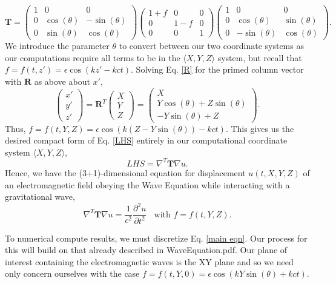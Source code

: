\documentclass{article}
\begin{document}
\begin{equation*}
\textbf{T}=
\begin{pmatrix}
1 & 0 & 0 \\
0 & \cos(\theta) & -\sin(\theta) \\
0 & \sin(\theta) & \cos(\theta)
\end{pmatrix}
\begin{pmatrix}
1+f & 0 & 0 \\
0 & 1-f & 0 \\
0 & 0 & 1
\end{pmatrix}
\begin{pmatrix}
1 & 0 & 0 \\
0 & \cos(\theta) & \sin(\theta) \\
0 & -\sin(\theta) & \cos(\theta)
\end{pmatrix}.
\end{equation*}
We introduce the parameter $\theta$ to convert between our two coordinate systems as our computations require all terms to be in the $\langle X,Y,Z\rangle$ system, but recall that $f=f(t,z\prime)=\epsilon \cos(kz\prime-kct)$. Solving Eq. \ref{R} for the primed column vector with $\textbf{R}$ as above about $x\prime$,
\begin{equation*}
\begin{pmatrix}
x\prime \\
y\prime \\
z\prime
\end{pmatrix}
= \textbf{R}^{T}\begin{pmatrix}
X \\
Y \\
Z
\end{pmatrix}
=\begin{pmatrix}
X \\
Y\cos(\theta)+Z\sin(\theta) \\
-Y\sin(\theta)+Z\
\end{pmatrix}.
\end{equation*}
Thus, $f=f(t,Y,Z)=\epsilon \cos(k(Z-Y\sin(\theta))-kct)$. This gives us the desired compact form of Eq. \ref{LHS} entirely in our computational coordinate system $\langle X,Y,Z\rangle$,
\begin{equation*}
LHS = \nabla^T \textbf{T} \nabla u.
\end{equation*}
Hence, we have the (3+1)-dimensional equation for displacement $u(t,X,Y,Z)$ of an electromagnetic field obeying the Wave Equation while interacting with a gravitational wave,
\begin{equation}\label{main eqn}
\boxed{
\nabla^T \textbf{T} \nabla u = \frac{1}{c^2}\frac{\partial^2 u}{\partial t^2} \ \ \ \ \mbox{with } f=f(t,Y,Z).
}
\end{equation}

To numerical compute results, we must discretize Eq. \ref{main eqn}. Our process for this will build on that already described in WaveEquation.pdf. Our plane of interest containing the electromagnetic waves is the XY plane and so we need only concern ourselves with the case $f=f(t,Y,0)=\epsilon \cos(kY\sin(\theta)+kct).$
\end{document}
